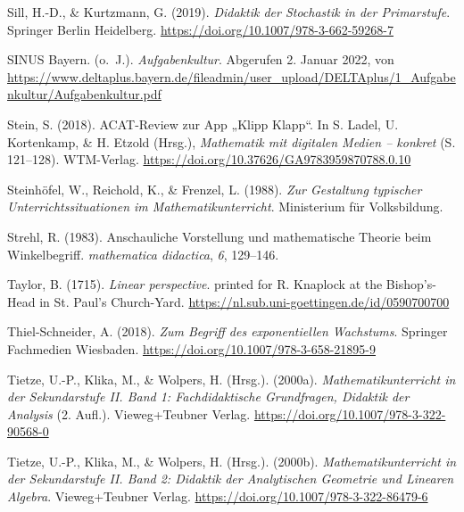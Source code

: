 \documentclass[
]{scrbook}
\newlength{\cslhangindent}
\newlength{\cslentryspacingunit} %
\newenvironment{CSLReferences}[2] %
 {%
  \setlength{\parindent}{0pt}
  \ifodd #1
  \let\oldpar\par
  \def\par{\hangindent=\cslhangindent\oldpar}
  \fi
  \setlength{\parskip}{#2\cslentryspacingunit}
 }%
 {}
\theoremstyle{definition}
\theoremstyle{definition}
\theoremstyle{definition}
\theoremstyle{definition}
\theoremstyle{remark}
\begin{document}
\begin{CSLReferences}{1}{0}
\leavevmode{}%
Sill, H.-D., \& Kurtzmann, G. (2019). \emph{Didaktik der {Stochastik} in der {Primarstufe}}. Springer Berlin Heidelberg. \url{https://doi.org/10.1007/978-3-662-59268-7}

\leavevmode{}%
SINUS Bayern. (o.~J.). \emph{Aufgabenkultur}. Abgerufen 2. Januar 2022, von \url{https://www.deltaplus.bayern.de/fileadmin/user_upload/DELTAplus/1_Aufgabenkultur/Aufgabenkultur.pdf}

\leavevmode{}%
Stein, S. (2018). {ACAT}-{Review} zur {App} „{Klipp} {Klapp}``. In S. Ladel, U. Kortenkamp, \& H. Etzold (Hrsg.), \emph{Mathematik mit digitalen {Medien} -- konkret} (S. 121--128). WTM-Verlag. \url{https://doi.org/10.37626/GA9783959870788.0.10}

\leavevmode{}%
Steinhöfel, W., Reichold, K., \& Frenzel, L. (1988). \emph{Zur {Gestaltung} typischer {Unterrichtssituationen} im {Mathematikunterricht}}. Ministerium für Volksbildung.

\leavevmode{}%
Strehl, R. (1983). Anschauliche {Vorstellung} und mathematische {Theorie} beim {Winkelbegriff}. \emph{mathematica didactica}, \emph{6}, 129--146.

\leavevmode{}%
Taylor, B. (1715). \emph{Linear perspective}. printed for R. Knaplock at the Bishop's-Head in St. Paul's Church-Yard. \url{https://nl.sub.uni-goettingen.de/id/0590700700}

\leavevmode{}%
Thiel-Schneider, A. (2018). \emph{Zum {Begriff} des exponentiellen {Wachstums}}. Springer Fachmedien Wiesbaden. \url{https://doi.org/10.1007/978-3-658-21895-9}

\leavevmode{}%
Tietze, U.-P., Klika, M., \& Wolpers, H. (Hrsg.). (2000a). \emph{Mathematikunterricht in der {Sekundarstufe} {II}. {Band} 1: {Fachdidaktische} {Grundfragen}, {Didaktik} der {Analysis}} (2. Aufl.). Vieweg+Teubner Verlag. \url{https://doi.org/10.1007/978-3-322-90568-0}

\leavevmode{}%
Tietze, U.-P., Klika, M., \& Wolpers, H. (Hrsg.). (2000b). \emph{Mathematikunterricht in der {Sekundarstufe} {II}. {Band} 2: {Didaktik} der {Analytischen} {Geometrie} und {Linearen} {Algebra}}. Vieweg+Teubner Verlag. \url{https://doi.org/10.1007/978-3-322-86479-6}


\end{CSLReferences}
\end{document}
